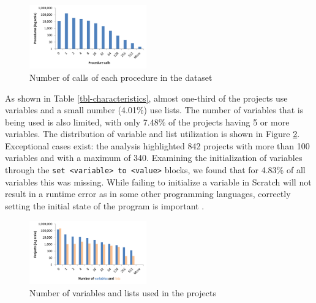 \documentclass{sig-alternate}
\begin{document}
\begin{figure}
	\centering
	\includegraphics[width=0.45\textwidth]{fig/charts/7procedurecalls}
	\vspace{-1em}
	\caption{Number of calls of each procedure in the dataset}
	\label{fig:procedurecalls}
\end{figure}

As shown in Table \ref{tbl-characteristics}, almost one-third of the projects use variables and a small number (4.01\%) use lists. The number of variables that is being used is also limited, with only 7.48\% of the projects having 5 or more variables. The distribution of variable and list utilization is shown in Figure \ref{fig:variables}. Exceptional cases exist: the analysis highlighted 842 projects with more than 100 variables and with a maximum of 340. Examining the initialization of variables through the \texttt{set <variable> to <value>} blocks, we found that for 4.83\% of all variables this was missing. While failing to initialize a variable in Scratch will not result in a runtime error as in some other programming languages, correctly setting the initial state of the program is important \cite{boe_hairball:_2013}.


\begin{figure}
	\centering
	\includegraphics[width=0.45\textwidth]{fig/charts/8variableslists}
	\vspace{-1em}
	\caption{Number of variables and lists used in the projects}
	\label{fig:variables}
\end{figure}
\end{document}
